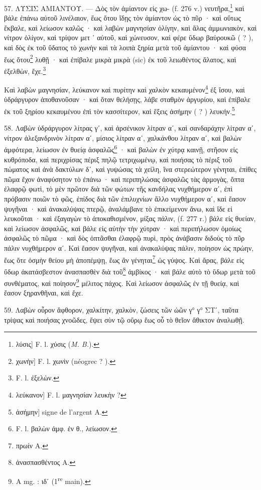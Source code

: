 \documentclass[a4paper, 11pt, oneside, polutonikogreek, french]{article}
\begin{document}
57. ΛΥΣΙΣ ΑΜΙΑΝΤΟΥ. --- Δὸς τὸν ἀμίαντον εἰς χω- (f. 276 v.) νευτῆρα,\footnote{λύσις] F. l. χύσις (\emph{M. B.}).} καὶ βάλε ἐπάνω αὐτοῦ λινέλαιον, ἕως ὅτου ἴδῃς τὸν ἀμίαντον ὡς τὸ πῦρ · καὶ οὕτως ἔκβαλε, καὶ λείωσον καλῶς · καὶ λαβὼν μαγνησίαν ὀλίγην, καὶ ἅλας ἀμμωνιακὸν, καὶ νίτρον ὀλίγον, καὶ τρίψον μετ ᾽ αὐτοῦ, καὶ χώνευσον, καὶ φέρε ὕδωρ βαὐρουκῶ ( ? ), καὶ δὸς ἐκ τοῦ ὕδατος τὸ χωνὴν καὶ τὰ λοιπὰ ξηρία μετὰ τοῦ ἀμίαντου · καὶ φύσα ἕως ὅτου\footnote{χωνὴν] F. l. χωνὶν (néogrec ? ).} λυθῇ · καὶ ἐπίβαλε μικρὰ μικρὰ (sic) ἐκ τοῦ λειωθέντος ἅλατος, καὶ ἐξελθὼν, ἔχε.\footnote{F. l. ἐξελὼν.}

Καὶ λαβὼν μαγνησίαν, λεύκανον καὶ πυρίτην καὶ χαλκὸν κεκαυμένον\footnote{λεύκανον] F. l. μαγνησίαν λευκὴν ?} ἐξ ἴσου, καὶ ὑδράργυρον ἀποθανοῦσαν · καὶ ὅταν θελήσῃς, λάβε σταθμὸν ἀργυρίου, καὶ ἐπίβαλε ἐκ τοῦ ξηρίου κεκαυμένου ἐπὶ τὸν κασσίτερον, καὶ ἕξεις ἀσήμην ( ? ) λευκήν.\footnote{ἀσήμην] signe de l'argent A.}

58. Λαβὼν ὑδράργυρον λίτρας γʹ, καὶ ἀρσένικον λίτραν αʹ, καὶ σανδαράχην λίτραν αʹ, νίτρον ἀλεξανδρινὸν λίτραν αʹ, μίσιος λίτραν αʹ, χαλκάνθου λίτραν αʹ, καὶ βαλὼν ἀμφότερα, λείωσον ἐν θυείᾳ ἀσφαλῶς\footnote{F. l. βαλὼν ἀμφ. ἐν θ., λείωσον.} · καὶ βαλὼν ἐν χύτρᾳ καινῇ, στῆσον εἰς κυθρόποδα, καὶ περιχρίσας πέριξ πηλῷ τετριχωμένῳ, καὶ ποιήσας τὸ πέριξ τοῦ πώματος καὶ ἀνὰ δακτύλων δʹ, καὶ γυψώσας τὰ χείλη, ἵνα στερεώτερον γένηται, ἐπίθες πῶμα ἔχον ἀναφύσητον τὸ ἐπάνω · καὶ περιπηλώσας ἀσφαλῶς τὰς ἀρμογὰς, ὄπτα ἐλαφρῷ φωτὶ, τὸ μὲν πρῶτον διὰ τῶν φώτων τῆς κανδήλας νυχθήμερον αʹ, ἐπὶ πρόβασιν ποιῶν τὸ φῶς, ἐπίδος διὰ τῶν ἐπιλυχνίων ἄλλο νυχθήμερον αʹ, καὶ ἔασον ψυγῆναι · καὶ ἀνακαλύψας πτερῷ, ἀναλάμβανε τὸ ἐπικείμενον ἄνω, καὶ ἴδε εἰ λευκοῦται · καὶ ἐξαγαγὼν τὸ ἀποκαθισμένον, μίξας πάλιν, (f. 277 r.) βάλε εἰς θυείαν, καὶ λείωσον ἀσφαλῶς, καὶ βάλε εἰς αὐτὴν τὴν χύτραν · καὶ περιπήλωσον ὁμοίως ἀσφαλῶς τὸ πῶμα · καὶ δὸς ὀπτᾶσθαι ἐλαφρῷ πυρὶ, πρὸς ἀνάβασιν διδοὺς τὸ πῦρ πάλιν νυχθήμερον αʹ. Καὶ ἔασον ψυγῆναι, καὶ ἀνακαλύψας πάλιν, ποίησον ὡς πρώην, ἕως ὅτε ὀσμὴν θείου μὴ ἀποπέμψῃ, ἕως ἂν γένηται\footnote{πρωίν A.} ὠς γύψος. Καὶ ἄρας, βάλε εἰς ὕδωρ ἀκατάσβεστον ἀνασπασθὲν διὰ τοῦ\footnote{ἀνασπασθέντος A.} ἀμβίκος · καὶ βάλε αὐτὸ τὸ ὕδωρ μετὰ τοῦ συνθέματος, καὶ ποίησον\footnote{A mg. : ιδʹ (1\textsuperscript{re} main).} μέλιτος πάχος. Καὶ λείωσον ἀσφαλῶς ἐν τῇ θυείᾳ, καὶ ἔασον ξηρανθῆναι, καὶ ἔχε.

59. Λαβὼν οὖρον ἄφθορον, χαλκίτην, χαλκὸν, ζώσεις τῶν ὠῶν γ° γ° ΣΤʹ, ταῦτα τρίψας καὶ ποιήσας χνοῶδες, ἕψει σὺν τῷ οὔρῳ ἕως οὗ τὸ θεῖον ἄθικτον ἀναλωθῇ.
\end{document}
